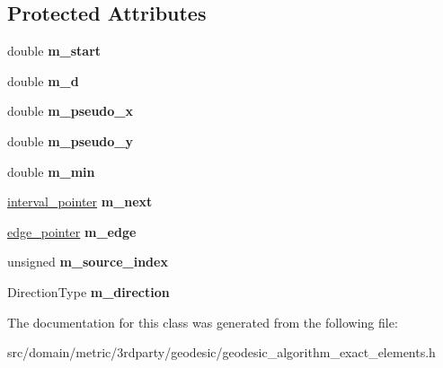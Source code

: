 \subsection*{Protected Attributes}
\begin{DoxyCompactItemize}
\item 
\hypertarget{classgeodesic_1_1_interval_a8d89da9d69e8c74fc9f57a925e327e40}{}double {\bfseries m\+\_\+start}\label{classgeodesic_1_1_interval_a8d89da9d69e8c74fc9f57a925e327e40}

\item 
\hypertarget{classgeodesic_1_1_interval_adf67a2204c29d71b2e220714d4289dd2}{}double {\bfseries m\+\_\+d}\label{classgeodesic_1_1_interval_adf67a2204c29d71b2e220714d4289dd2}

\item 
\hypertarget{classgeodesic_1_1_interval_a92ad82dae3e03ba370f2a9dd95613df6}{}double {\bfseries m\+\_\+pseudo\+\_\+x}\label{classgeodesic_1_1_interval_a92ad82dae3e03ba370f2a9dd95613df6}

\item 
\hypertarget{classgeodesic_1_1_interval_ad470a1ccb1cbf146242a6d65d89836be}{}double {\bfseries m\+\_\+pseudo\+\_\+y}\label{classgeodesic_1_1_interval_ad470a1ccb1cbf146242a6d65d89836be}

\item 
\hypertarget{classgeodesic_1_1_interval_a9533fe7b0c0f5628cb285fbd9b5b471f}{}double {\bfseries m\+\_\+min}\label{classgeodesic_1_1_interval_a9533fe7b0c0f5628cb285fbd9b5b471f}

\item 
\hypertarget{classgeodesic_1_1_interval_a8baec5bb8eaf4564e11031bc2cc9e564}{}\hyperlink{classgeodesic_1_1_interval}{interval\+\_\+pointer} {\bfseries m\+\_\+next}\label{classgeodesic_1_1_interval_a8baec5bb8eaf4564e11031bc2cc9e564}

\item 
\hypertarget{classgeodesic_1_1_interval_a78f10c0e93ae78dc5678521343ef77bb}{}\hyperlink{classgeodesic_1_1_edge}{edge\+\_\+pointer} {\bfseries m\+\_\+edge}\label{classgeodesic_1_1_interval_a78f10c0e93ae78dc5678521343ef77bb}

\item 
\hypertarget{classgeodesic_1_1_interval_a64da19b53cef242f41bd8918eac779f5}{}unsigned {\bfseries m\+\_\+source\+\_\+index}\label{classgeodesic_1_1_interval_a64da19b53cef242f41bd8918eac779f5}

\item 
\hypertarget{classgeodesic_1_1_interval_a730c09218166ddcfc17759184c482ce8}{}Direction\+Type {\bfseries m\+\_\+direction}\label{classgeodesic_1_1_interval_a730c09218166ddcfc17759184c482ce8}

\end{DoxyCompactItemize}


The documentation for this class was generated from the following file\+:\begin{DoxyCompactItemize}
\item 
src/domain/metric/3rdparty/geodesic/geodesic\+\_\+algorithm\+\_\+exact\+\_\+elements.\+h\end{DoxyCompactItemize}
